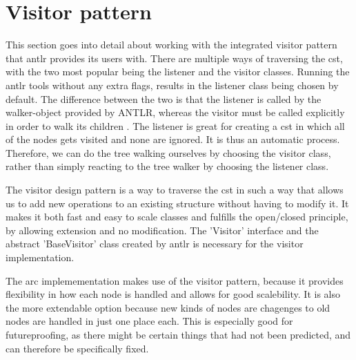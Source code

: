 \section{Visitor pattern}\label{sec:visitorpattern}

This section goes into detail about working with the integrated visitor pattern that \gls{antlr} provides its users with. There are multiple ways of traversing the \gls{cst}, with the two most popular being the listener and the visitor classes. Running the \gls{antlr} tools without any extra flags, results in the listener class being chosen by default. The difference between the two is that the listener is called by the walker-object provided by ANTLR, whereas the visitor must be called explicitly in order to walk its children \cite{Parr2014}. The listener is great for creating a \gls{cst} in which all of the nodes gets visited and none are ignored. It is thus an automatic process. Therefore, we can do the tree walking ourselves by choosing the visitor class, rather than simply reacting to the tree walker by choosing the listener class.

The visitor design pattern is a way to traverse the \gls{cst} in such a way that allows us to add new operations to an existing structure without having to modify it. It makes it both fast and easy to scale classes and fulfills the open/closed principle, by allowing extension and no modification. The 'Visitor' interface and the abstract 'BaseVisitor' class created by \gls{antlr} is necessary for the visitor implementation.






The arc implemementation makes use of the visitor pattern, because it provides flexibility in how each node is handled and allows for good scalebility. It is also the more extendable option because new kinds of nodes are chagenges to old nodes are handled in just one place each. This is especially good for futureproofing, as there might be certain things that had not been predicted, and can therefore be specifically fixed.

